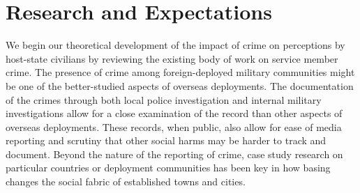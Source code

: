 \section*{Research and Expectations}

We begin our theoretical development of the impact of crime on perceptions by host-state civilians by reviewing the existing body of work on service member crime. The presence of crime among foreign-deployed military communities might be one of the better-studied aspects of overseas deployments. The documentation of the crimes through both local police investigation and internal military investigations allow for a close examination of the record than other aspects of overseas deployments. These records, when public, also allow for ease of media reporting and scrutiny that other social harms may be harder to track and document. Beyond the nature of the reporting of crime, case study research on particular countries or deployment communities has been key in how basing changes the social fabric of established towns and cities.

